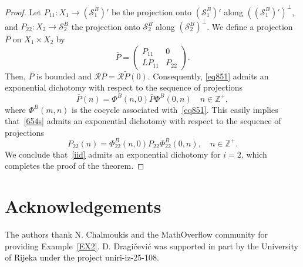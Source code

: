 \documentclass[11pt,reqno,a4paper]{amsart}
\theoremstyle{plain}
\numberwithin{equation}{section}
\theoremstyle{remark}
\def\Z{\mathbb{Z}}
\begin{document}
\begin{proof}
Let $P_{11}\colon X_1\to (\mathcal S_1^B)'$ be the projection onto $(\mathcal S_1^B)'$ along $((\mathcal S_1^B)')^\perp$, and $P_{22}\colon X_2\to \mathcal S_2^B$ the projection onto $\mathcal S_2^B$ along $(\mathcal S_2^B)^\perp$. We define a projection $\bar P$ on $X_1\times X_2$ by 
\[
\bar P=\begin{pmatrix}
P_{11} & 0\\
LP_{11} &P_{22}
\end{pmatrix}.
\]
Then, $\bar P$ is bounded and $\mathcal R\bar P=\mathcal R\tilde P(0)$. Consequently, \eqref{eq851} admits an exponential dichotomy with respect to the sequence of projections
\[
\bar P(n)=\Phi^B(n, 0)\bar P\Phi^B(0, n) \quad n\in \Z^+,
\]
where $\Phi^B(m, n)$ is the cocycle associated with~\eqref{eq851}. This easily implies that~\eqref{654s} admits an exponential dichotomy with respect to the sequence of projections
\[
P_{22}(n)=\Phi_{22}^B(n, 0)P_{22}\Phi_{22}^B(0, n), \quad n\in \Z^+.
\]
We conclude that~\eqref{iid} admits an exponential dichotomy for $i=2$, which completes the proof of the theorem.



\end{proof}

\section*{Acknowledgements}  
The authors thank N. Chalmoukis and the MathOverflow community for providing Example~\ref{EX2}.
D. Dragi\v cevi\' c was supported in part by the University of Rijeka under the project uniri-iz-25-108.
\end{document}

